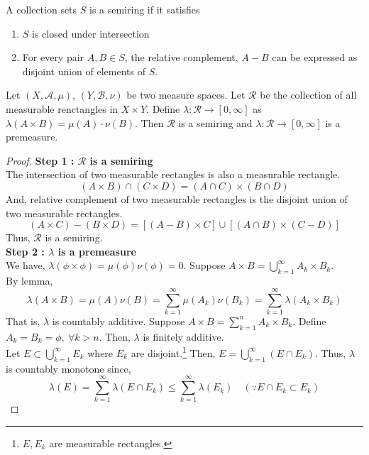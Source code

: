 \begin{definition}[semiring]
	A collection sets $S$ is a semiring if it satisfies
	\begin{enumerate}
		\item $S$ is closed under intersection
		\item For every pair $A,B \in S$, the relative complement, $A-B$ can be expressed as disjoint union of elements of $S$.
	\end{enumerate}
\end{definition}

\begin{theorem}
	Let $(X,\mathcal{A},\mu)$, $(Y,\mathcal{B},\nu)$ be two measure spaces.
	Let $\mathcal{R}$ be the collection of all measurable renctangles in $X \times Y$.
	Define $\lambda : \mathcal{R} \to [0,\infty]$ as $\lambda(A \times B) = \mu(A) \cdot \nu(B)$.
	Then $\mathcal{R}$ is a semiring and $\lambda : \mathcal{R} \to [0,\infty]$ is a premeasure.
\end{theorem}
\begin{proof}
	\textbf{Step 1 : $\mathcal{R}$ is a semiring}\\
	The intersection of two measurable rectangles is also a measurable rectangle.
	$$ (A \times B) \cap (C \times D) = (A \cap C) \times (B \cap D) $$
	And, relative complement of two measurable rectangles is the disjoint union of two measurable rectangles.
	$$ (A \times C) - (B \times D) = [(A-B) \times C] \cup [(A \cap B) \times (C-D)] $$
	Thus, $\mathcal{R}$ is a semiring.\\

	\textbf{Step 2 : $\lambda$ is a premeasure}\\
	We have, $\lambda(\phi \times \phi) = \mu(\phi)\nu(\phi) = 0$.
	Suppose $\displaystyle A \times B = \bigcup_{k=1}^\infty A_k \times B_k$.\\
	By lemma, 
	$$\lambda(A \times B) = \mu(A) \nu(B) = \sum_{k=1}^\infty \mu(A_k) \nu(B_k) = \sum_{k=1}^\infty \lambda(A_k \times B_k) $$
	That is, $\lambda$ is countably additive.
	Suppose $\displaystyle A \times B = \sum_{k=1}^n A_k \times B_k$.
	Define $A_k = B_k = \phi,\ \forall k > n$.
	Then, $\lambda$ is finitely additive.\\

	Let $\displaystyle E \subset \bigcup_{k=1}^\infty E_k$ where $E_k$ are disjoint.\footnote{$E,E_k$ are measurable rectangles.}
	Then, $\displaystyle E = \bigcup_{k=1}^\infty (E \cap E_k)$.
	Thus, $\lambda$ is countably monotone since,
	$$ \lambda(E) = \sum_{k=1}^\infty \lambda(E \cap E_k) \le \sum_{k=1}^\infty \lambda(E_k) \quad (\because E \cap E_k \subset E_k) $$
\end{proof}

